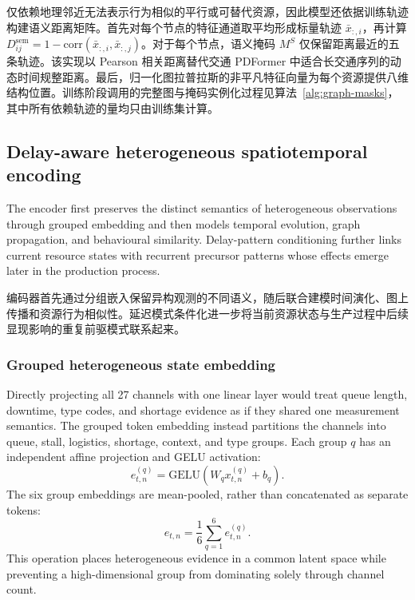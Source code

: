 \documentclass[a4paper,fleqn]{cas-dc}
\newcommand{\zhpara}[1]{%
  \par\begingroup\small\color{black!72}\noindent #1\par\endgroup}
\begin{document}
\zhpara{仅依赖地理邻近无法表示行为相似的平行或可替代资源，因此模型还依据训练轨迹构建语义距离矩阵。首先对每个节点的特征通道取平均形成标量轨迹 $\bar x_{:,i}$，再计算 $D^{\mathrm{sem}}_{ij}=1-\mathrm{corr}(\bar{x}_{:,i},\bar{x}_{:,j})$。对于每个节点，语义掩码 $M^S$ 仅保留距离最近的五条轨迹。该实现以 Pearson 相关距离替代交通 PDFormer 中适合长交通序列的动态时间规整距离。最后，归一化图拉普拉斯的非平凡特征向量为每个资源提供八维结构位置。训练阶段调用的完整图与掩码实例化过程见算法~\ref{alg:graph-masks}，其中所有依赖轨迹的量均只由训练集计算。}

\subsection{Delay-aware heterogeneous spatiotemporal encoding}

The encoder first preserves the distinct semantics of heterogeneous observations through grouped embedding and then models temporal evolution, graph propagation, and behavioural similarity. Delay-pattern conditioning further links current resource states with recurrent precursor patterns whose effects emerge later in the production process.

\zhpara{编码器首先通过分组嵌入保留异构观测的不同语义，随后联合建模时间演化、图上传播和资源行为相似性。延迟模式条件化进一步将当前资源状态与生产过程中后续显现影响的重复前驱模式联系起来。}

\subsubsection{Grouped heterogeneous state embedding}

Directly projecting all 27 channels with one linear layer would treat queue length, downtime, type codes, and shortage evidence as if they shared one measurement semantics. The grouped token embedding instead partitions the channels into queue, stall, logistics, shortage, context, and type groups. Each group $q$ has an independent affine projection and GELU activation:
\begin{equation}
e^{(q)}_{t,n}=\mathrm{GELU}
\left(W_q x^{(q)}_{t,n}+b_q\right).
\end{equation}
The six group embeddings are mean-pooled, rather than concatenated as separate tokens:
\begin{equation}
e_{t,n}=\frac{1}{6}\sum_{q=1}^{6}e^{(q)}_{t,n}.
\end{equation}
This operation places heterogeneous evidence in a common latent space while preventing a high-dimensional group from dominating solely through channel count.
\end{document}
